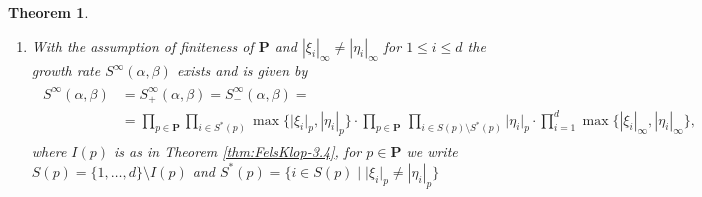 \documentclass[oneside]{amsart}
\newtheorem{thm}{Theorem}
\begin{document}
\begin{thm}
\begin{enumerate}
    \item[\rm (ii)] With the assumption of finiteness of $\mathbf{P}$ and
      $|\xi_i|_\infty \neq |\eta_i|_\infty$ for $1 \leq i \leq d$
      the growth rate $S^\infty(\alpha, \beta)$ exists and is given by
      \begin{align} \label{eq:S-infty-formula}
      \begin{split}
        S^\infty(\alpha, \beta) &= S^\infty_+(\alpha, \beta) = S^\infty_-(\alpha, \beta) = \\
        &= \prod_{p \in \mathbf{P}} \prod_{i \in S^*(p)} \max \{ \lvert \xi_{i} \rvert_p,  |\eta_{i}|_p\} \cdot
             \prod_{p \in \mathbf{P}} \, \prod_{i \in S(p)\setminus S^*(p)}\lvert \eta_{i} \rvert_p  \cdot
             \prod_{i=1}^{d} \max\{|\xi_{i}|_\infty, |\eta_{i}|_\infty\},
      \end{split}
      \end{align}
      where $I(p)$ is as in {\rm Theorem \ref{thm:FelsKlop-3.4}}, for $p \in \mathbf{P}$ we write $S(p) = \{1,\dots,d\}\setminus I(p)$
      and $S^*(p) = \big\{i \in S(p) \mid \lvert \xi_{i} \rvert_p \neq |\eta_{i}|_p \big\}$
  \end{enumerate}
\end{thm}
\end{document}
